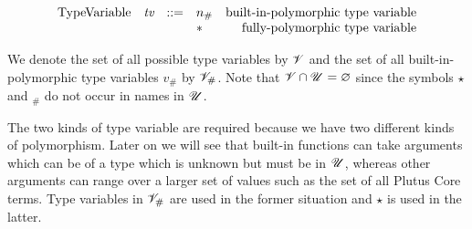 \begin{minipage}{\linewidth}
  \centering
      \[\begin{array}{lrclr}
        \textrm{TypeVariable}    & \tv & ::= & n_{\#} & \textrm{built-in-polymorphic type variable}\\
                                 &    &      & \star & \textrm{fully-polymorphic type variable}\\
    \end{array}\]
    \label{fig:type-variables}
\end{minipage}


\medskip
\noindent
We denote the set of all possible type variables by $\mathscr{V}$ and the set of all
built-in-polymorphic type variables $v_\#$ by $\mathscr{V}_\#$.  Note that $\mathscr{V} \cap
\mathscr{U} = \varnothing$ since the symbols $\star$ and ${}_\#$ do not occur in names in $\mathscr{U}$.%
%
%
%
%

The two kinds of type variable are required because we have two different kinds
of polymorphism. Later on we will see that built-in functions can take arguments
which can be of a type which is unknown but must be in $\mathscr{U}$, whereas other
arguments can range over a larger set of values such as the set of all Plutus
Core terms. Type variables in $\mathscr{V}_\#$ are used in the former situation and
$\star$ is used in the latter.

